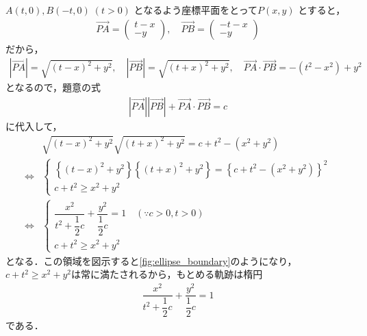\documentclass[../../main.tex]{subfiles}
\begin{document}
$A(t, 0), B(-t, 0) \; (t > 0)$ となるよう座標平面をとって$P(x, y)$ とすると，
\begin{align}
  \overrightarrow{PA} =
  \begin{pmatrix} t - x \\ -y
  \end{pmatrix}, \quad \overrightarrow{PB} =
  \begin{pmatrix} -t - x \\ -y
  \end{pmatrix}
\end{align}
だから，
\begin{align}
  |\overrightarrow{PA}| = \sqrt{(t - x)^2 + y^2},
  \quad
  |\overrightarrow{PB}| = \sqrt{(t + x)^2 + y^2},
  \quad
  \overrightarrow{PA} \cdot \overrightarrow{PB} = -(t^2 - x^2) + y^2
\end{align}
となるので，題意の式
\begin{align}
  |\overrightarrow{PA}||\overrightarrow{PB}|+\overrightarrow{PA}\cdot\overrightarrow{PB}=c
\end{align}
に代入して，
\begin{align}
  & \sqrt{(t - x)^2 + y^2} \sqrt{(t + x)^2 + y^2} = c + t^2 - (x^2 + y^2) \\
  \iff
  &
  \begin{cases}
    \left\{ (t - x)^2 + y^2 \right\} \left\{ (t + x)^2 + y^2 \right\} = \left\{ c + t^2 - (x^2 + y^2) \right\}^2 \\
    c+t^2 \ge x^2+y^2
  \end{cases} \\
  \iff
  &
  \begin{cases}
    \dfrac{x^2}{t^2 + \dfrac{1}{2} c} + \dfrac{y^2}{\dfrac{1}{2} c} = 1 \quad (\because c > 0, t > 0) \\
    c + t^2 \ge x^2 + y^2
  \end{cases}
\end{align}
となる．この領域を図示すると\cref{fig:ellipse_boundary}のようになり，$c + t^2 \ge x^2 + y^2$は常に満たされるから，もとめる軌跡は楕円
\begin{align}
  \dfrac{x^2}{t^2 + \dfrac{1}{2} c} + \dfrac{y^2}{\dfrac{1}{2} c} = 1
\end{align}
である．
\end{document}
